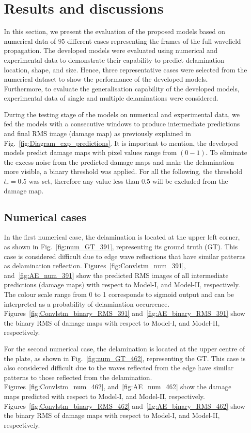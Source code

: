 \section{Results and discussions}
\begin{sloppypar}
	In this section, we present the evaluation of the proposed models based on numerical data of \(95\) different cases representing the frames of the full wavefield propagation. 
	The developed models were evaluated using numerical and experimental data to demonstrate their capability to predict delamination location, shape, and size.	
	Hence, three representative cases were selected from the numerical dataset to show the performance of the developed models.
	Furthermore, to evaluate the generalisation capability of the developed models, experimental data of single and multiple delaminations were considered.
	
	During the testing stage of the models on numerical and experimental data, we fed the models with a consecutive windows to produce intermediate predictions and final RMS image (damage map) as previously explained in Fig.~\ref{fig:Diagram_exp_predictions}.
	It is important to mention, the developed models predict damage maps with pixel values range from \((0-1)\).
	To eliminate the excess noise from the predicted damage maps and make the delamination more visible, a binary threshold was applied.
	For all the following, the threshold $t_r=0.5$ was set, therefore any value less than $0.5$ will be excluded from the damage map.
	
	\subsection{Numerical cases}
	In the first numerical case, the delamination is located at the upper left corner, as shown in Fig.~\ref{fig:num_GT_391}, representing its ground truth (GT).
	This case is considered difficult due to edge wave reflections that have similar patterns as delamination reflection.
	Figures~\ref{fig:Convlstm_num_391}, and~\ref{fig:AE_num_391} show the predicted RMS images of all intermediate predictions (damage maps) with respect to Model-I, and Model-II, respectively.
	The colour scale range from 0 to 1 corresponds to sigmoid output and can be interpreted as a probability of delamination occurrence.
	Figures~\ref{fig:Convlstm_binary_RMS_391} and~\ref{fig:AE_binary_RMS_391} show the binary RMS of damage maps with respect to Model-I, and Model-II, respectively.
	
	For the second numerical case, the delamination is located at the upper centre of the plate, as shown in Fig.~\ref{fig:num_GT_462}, representing the GT.
	This case is also considered difficult due to the waves reflected from the edge have similar patterns to those reflected from the delamination.
	Figures~\ref{fig:Convlstm_num_462}, and~\ref{fig:AE_num_462} show the damage maps predicted with respect to Model-I, and Model-II, respectively.
	Figures~\ref{fig:Convlstm_binary_RMS_462} and~\ref{fig:AE_binary_RMS_462} show the binary RMS of damage maps with respect to Model-I, and Model-II, respectively.
	

\end{sloppypar}
